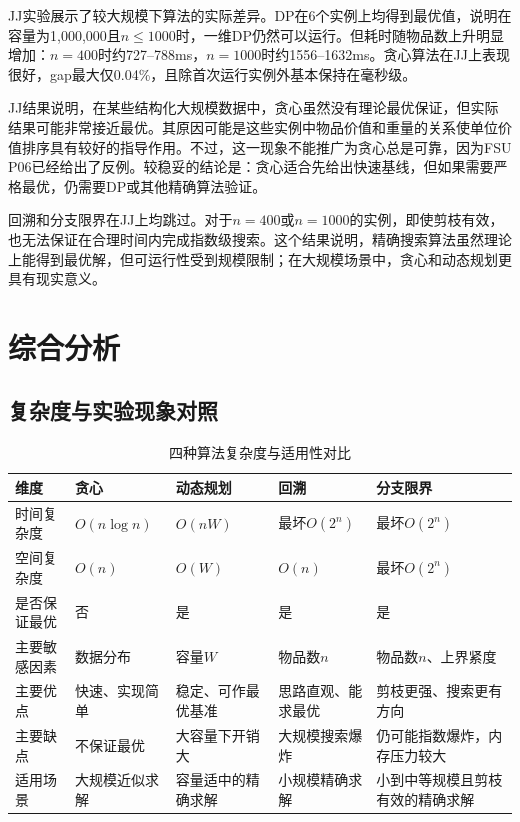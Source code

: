 \documentclass[10.5pt,a4paper,fontset=none]{ctexart}
\begin{document}
JJ实验展示了较大规模下算法的实际差异。DP在6个实例上均得到最优值，说明在容量为1,000,000且$n \leq 1000$时，一维DP仍然可以运行。但耗时随物品数上升明显增加：$n=400$时约727--788ms，$n=1000$时约1556--1632ms。贪心算法在JJ上表现很好，gap最大仅0.04\%，且除首次运行实例外基本保持在毫秒级。

JJ结果说明，在某些结构化大规模数据中，贪心虽然没有理论最优保证，但实际结果可能非常接近最优。其原因可能是这些实例中物品价值和重量的关系使单位价值排序具有较好的指导作用。不过，这一现象不能推广为贪心总是可靠，因为FSU P06已经给出了反例。较稳妥的结论是：贪心适合先给出快速基线，但如果需要严格最优，仍需要DP或其他精确算法验证。

回溯和分支限界在JJ上均跳过。对于$n=400$或$n=1000$的实例，即使剪枝有效，也无法保证在合理时间内完成指数级搜索。这个结果说明，精确搜索算法虽然理论上能得到最优解，但可运行性受到规模限制；在大规模场景中，贪心和动态规划更具有现实意义。

\FloatBarrier


\section{综合分析}

\subsection{复杂度与实验现象对照}

\begin{table}[!htbp]
\centering
\footnotesize
\caption{四种算法复杂度与适用性对比}
\begin{tabular}{p{2.0cm}p{2.6cm}p{2.7cm}p{2.7cm}p{2.8cm}}
\toprule
维度 & 贪心 & 动态规划 & 回溯 & 分支限界 \\
\midrule
时间复杂度 & $O(n\log n)$ & $O(nW)$ & 最坏$O(2^n)$ & 最坏$O(2^n)$ \\
空间复杂度 & $O(n)$ & $O(W)$ & $O(n)$ & 最坏$O(2^n)$ \\
是否保证最优 & 否 & 是 & 是 & 是 \\
主要敏感因素 & 数据分布 & 容量$W$ & 物品数$n$ & 物品数$n$、上界紧度 \\
主要优点 & 快速、实现简单 & 稳定、可作最优基准 & 思路直观、能求最优 & 剪枝更强、搜索更有方向 \\
主要缺点 & 不保证最优 & 大容量下开销大 & 大规模搜索爆炸 & 仍可能指数爆炸，内存压力较大 \\
适用场景 & 大规模近似求解 & 容量适中的精确求解 & 小规模精确求解 & 小到中等规模且剪枝有效的精确求解 \\
\bottomrule
\end{tabular}
\end{table}
\end{document}
